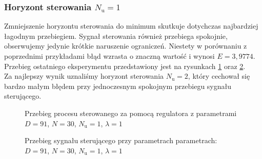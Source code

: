 \subsubsection{Horyzont sterowania $N_{\mathrm{u}} = 1$}
Zmniejszenie horyzontu sterowania do minimum skutkuje dotychczas najbardziej łagodnym przebiegiem. Sygnał sterowania również przebiega spokojnie, obserwujemy jedynie krótkie naruszenie ograniczeń. Niestety w porównaniu z poprzednimi przykładami błąd wzrasta o znaczną wartość i wynosi $E = 3,9774$. Przebieg ostatniego eksperymentu przedstawiony jest na rysunkach \ref{dmc_Nu_1_y} oraz \ref{dmc_Nu_1_u}.\\
\indent{} Za najlepszy wynik uznaliśmy horyzont sterowania $N_{\mathrm{u}} = 2$, który cechował się bardzo małym błędem przy jednoczesnym spokojnym przebiegu sygnału sterującego.
\\
\begin{figure}[t]
    \centering
    \caption{Przebieg procesu sterowanego za pomocą regulatora z parametrami $D = 91$, $N = 30$, $N_{\mathrm{u}} = 1$, $\lambda = 1$}
    \label{dmc_Nu_1_y}
\end{figure}

\begin{figure}[b]
    \centering
    \caption{Przebieg sygnału sterującego przy parametrach parametrach: $D = 91$, $N = 30$, $N_{\mathrm{u}} = 1$, $\lambda = 1$}
    \label{dmc_Nu_1_u}
\end{figure}
\FloatBarrier
